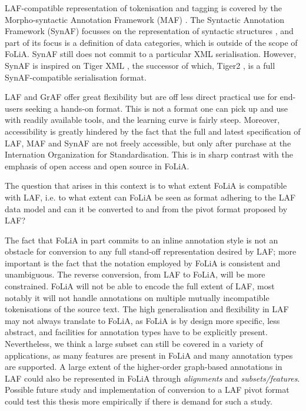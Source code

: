 \documentclass[a4paper,10pt,twoside]{article}
\begin{document}
LAF-compatible representation of tokenisation and tagging is covered by the
Morpho-syntactic Annotation Framework (MAF) \cite{MAF}. The Syntactic Annotation
Framework (SynAF) focusses on the representation of syntactic structures
\cite{SYNAF}, and part of its focus is a definition of data categories, which
is outside of the scope of FoLiA. SynAF still does not commit to a particular
XML serialisation. However, SynAF is inspired on Tiger XML \cite{TIGER}, the successor
of which, Tiger2 \cite{TIGER2}, is a full SynAF-compatible serialisation
format.

LAF and GrAF offer great flexibility but are off less direct practical use for
end-users seeking a hands-on format. This is not a format one can pick up and use with
readily available tools, and the learning curve is fairly steep. Moreover,
accessibility is greatly hindered by the fact that the full and latest specification
of LAF, MAF and SynAF are not freely accessible, but only after purchase at the Internation Organization
for Standardisation. This is in sharp contrast with the emphasis of open
access and open source in FoLiA. 

The question that arises in this context is to what extent FoLiA is compatible
with LAF, i.e. to what extent can FoLiA be seen as format adhering to the LAF
data model and can it be converted to and from the pivot format proposed by LAF?

The fact that FoLiA in part commits to an inline annotation style is not an
obstacle for conversion to any full stand-off representation desired by LAF;
more important is the fact that the notation employed by FoLiA is consistent
and unambiguous. The reverse conversion, from LAF to FoLiA, will be more
constrained. FoLiA will not be able to encode the full extent of LAF, most
notably it will not handle annotations on multiple mutually incompatible
tokenisations of the source text. The high generalisation and flexibility in
LAF may not always translate to FoLiA, as FoLiA is by design more specific,
less abstract, and facilities for annotation types have to be explicitly
present. Nevertheless, we think a large subset can still be covered in a
variety of applications, as many features are present in FoLiA and many
annotation types are supported. A large extent of the higher-order graph-based
annotations in LAF could also be represented in FoLiA through
\emph{alignments} and \emph{subsets/features}.  Possible future study and
implementation of conversion to a LAF pivot format could test this thesis more
empirically if there is demand for such a study.
\end{document}
